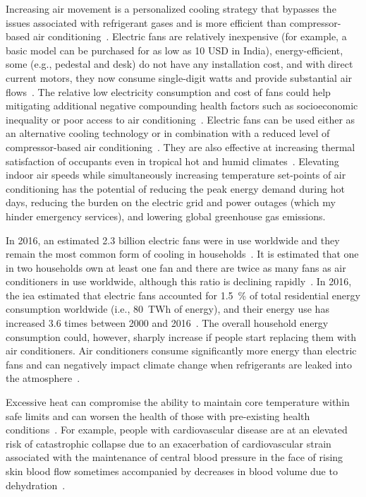 Increasing air movement is a personalized cooling strategy that bypasses the issues associated with refrigerant gases and is more efficient than compressor-based air conditioning~\cite{Morris2021a}.
Electric fans are relatively inexpensive (for example, a basic model can be purchased for as low as 10 USD in India), energy-efficient, some (e.g., pedestal and desk) do not have any installation cost, and with direct current motors, they now consume single-digit watts and provide substantial air flows~\cite{Yang2015a}.
The relative low electricity consumption and cost of fans could help mitigating additional negative compounding health factors such as socioeconomic inequality or poor access to air conditioning~\cite{Morris2021a}.
Electric fans can be used either as an alternative cooling technology or in combination with a reduced level of compressor-based air conditioning~\cite{Jay2019a, Hoyt2015, Schiavon2008}.
They are also effective at increasing thermal satisfaction of occupants even in tropical hot and humid climates~\cite{Lipczynska2018a}.
Elevating indoor air speeds while simultaneously increasing temperature set-points of air conditioning has the potential of reducing the peak energy demand during hot days, reducing the burden on the electric grid and power outages (which my hinder emergency services), and lowering global greenhouse gas emissions.

In 2016, an estimated 2.3 billion electric fans were in use worldwide and they remain the most common form of cooling in households~\cite{IEA2018}.
It is estimated that one in two households own at least one fan and there are twice as many fans as air conditioners in use worldwide, although this ratio is declining rapidly~\cite{IEA2018}.
In 2016, the \ac{iea} estimated that electric fans accounted for 1.5~\% of total residential energy consumption worldwide (i.e., 80~TWh of energy), and their energy use has increased 3.6 times between 2000 and 2016~\cite{IEA2018}.
The overall household energy consumption could, however, sharply increase if people start replacing them with air conditioners.
Air conditioners consume significantly more energy than electric fans and can negatively impact climate change when refrigerants are leaked into the atmosphere~\cite{IEA2018}.

Excessive heat can compromise the ability to maintain core temperature within safe limits and can worsen the health of those with pre-existing health conditions~\cite{WMO2015}.
For example, people with cardiovascular disease are at an elevated risk of catastrophic collapse due to an exacerbation of cardiovascular strain associated with the maintenance of central blood pressure in the face of rising skin blood flow sometimes accompanied by decreases in blood volume due to dehydration~\cite{Morris2021a}.

